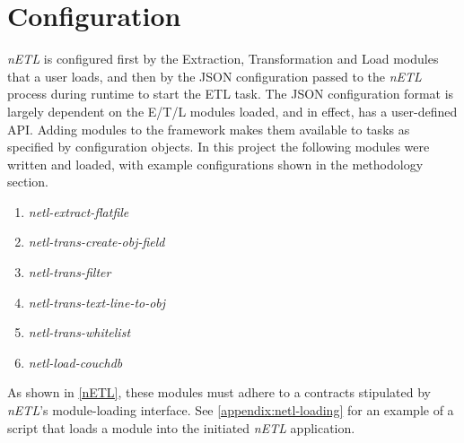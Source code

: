 \section{Configuration}

\textit{nETL} is configured first by the Extraction, Transformation and Load modules that a user loads, and then by the JSON configuration passed to the \textit{nETL} process during runtime to start the ETL task. The JSON configuration format is largely dependent on the E/T/L modules loaded, and in effect, has a user-defined API. Adding modules to the framework makes them available to tasks as specified by configuration objects. In this project the following modules were written and loaded, with example configurations shown in the methodology section.

\begin{enumerate}
    \item \textit{netl-extract-flatfile}
    \item \textit{netl-trans-create-obj-field}
    \item \textit{netl-trans-filter}
    \item \textit{netl-trans-text-line-to-obj}
    \item \textit{netl-trans-whitelist}
    \item \textit{netl-load-couchdb}
\end{enumerate}

As shown in \ref{nETL}, these modules must adhere to a contracts stipulated by \textit{nETL}'s module-loading interface. See \ref{appendix:netl-loading} for an example of a script that loads a module into the initiated \textit{nETL} application.